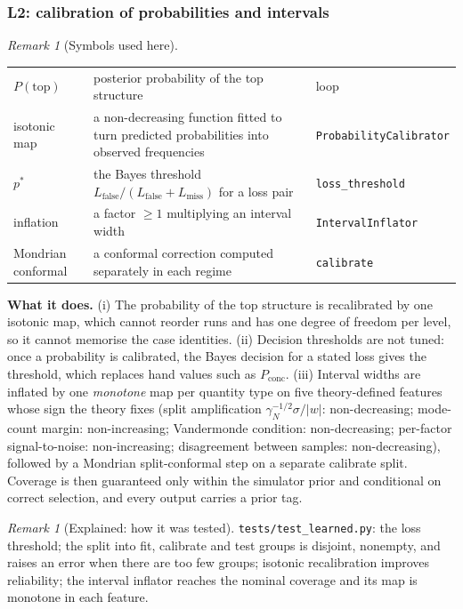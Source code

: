 \documentclass[11pt]{article}
\theoremstyle{plain}
\theoremstyle{definition}
\theoremstyle{remark}
\newtheorem{remark}[theorem]{Remark}
\newenvironment{explained}[1]{\begin{remark}[Explained: #1]}{\end{remark}}
\newenvironment{symbols}{\begin{remark}[Symbols used here]}{\end{remark}}
\begin{document}
\subsubsection{L2: calibration of probabilities and intervals}\label{f:sec:calib}
\begin{symbols}
\begin{tabular}{@{}L{2.6cm}L{6.0cm}L{4.3cm}@{}}
$P(\text{top})$ & posterior probability of the top structure & loop\\
isotonic map & a non-decreasing function fitted to turn predicted probabilities into observed frequencies & \texttt{ProbabilityCalibrator}\\
$p^*$ & the Bayes threshold $L_{\mathrm{false}}/(L_{\mathrm{false}}+L_{\mathrm{miss}})$ for a loss pair & \texttt{loss\_threshold}\\
inflation & a factor $\ge1$ multiplying an interval width & \texttt{IntervalInflator}\\
Mondrian conformal & a conformal correction computed separately in each regime & \texttt{calibrate}\\
\end{tabular}
\end{symbols}
\textbf{What it does.} (i) The probability of the top structure is recalibrated by one isotonic map, which cannot reorder runs and has one degree of freedom per level, so it cannot memorise the case identities. (ii) Decision thresholds are not tuned: once a probability is calibrated, the Bayes decision for a stated loss gives the threshold, which replaces hand values such as $P_{\mathrm{conc}}$. (iii) Interval widths are inflated by one \emph{monotone} map per quantity type on five theory-defined features whose sign the theory fixes (split amplification $\gamma_N^{-1/2}\sigma/|w|$: non-decreasing; mode-count margin: non-increasing; Vandermonde condition: non-decreasing; per-factor signal-to-noise: non-increasing; disagreement between samples: non-decreasing), followed by a Mondrian split-conformal step on a separate calibrate split. Coverage is then guaranteed only within the simulator prior and conditional on correct selection, and every output carries a prior tag.

\begin{explained}{how it was tested}
\texttt{tests/test\_learned.py}: the loss threshold; the split into fit, calibrate and test groups is disjoint, nonempty, and raises an error when there are too few groups; isotonic recalibration improves reliability; the interval inflator reaches the nominal coverage and its map is monotone in each feature.
\end{explained}
\end{document}

